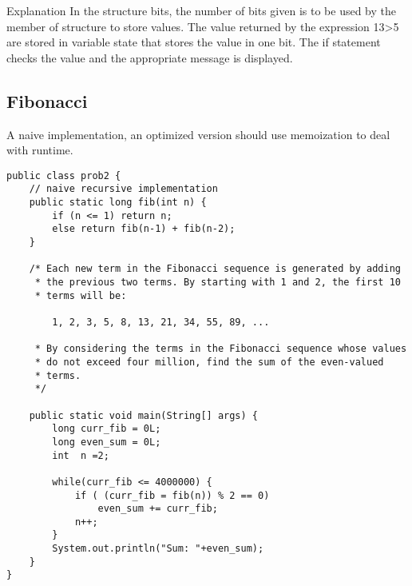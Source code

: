 \documentclass[letterpaper]{article}
\begin{document}
Explanation In the structure bits, the number of bits given is to be used by the member of structure to store values. The value returned by the expression 13>5 are stored in variable state that stores the value in one bit. The if statement checks the value and the appropriate message is displayed.

\subsection{Fibonacci}
A naive implementation, an optimized version should use memoization to deal with runtime.

\begin{lstlisting}
public class prob2 {
	// naive recursive implementation
	public static long fib(int n) {
        if (n <= 1) return n;
        else return fib(n-1) + fib(n-2);
    }
	
	/* Each new term in the Fibonacci sequence is generated by adding 
	 * the previous two terms. By starting with 1 and 2, the first 10 
	 * terms will be:

		1, 2, 3, 5, 8, 13, 21, 34, 55, 89, ...

	 * By considering the terms in the Fibonacci sequence whose values 
	 * do not exceed four million, find the sum of the even-valued 
	 * terms.
	 */

	public static void main(String[] args) {
		long curr_fib = 0L;
		long even_sum = 0L;
		int  n =2;
		
		while(curr_fib <= 4000000) {
			if ( (curr_fib = fib(n)) % 2 == 0)
				even_sum += curr_fib;
			n++;
		}
		System.out.println("Sum: "+even_sum);
	}
}
\end{lstlisting}
%  

%
\end{document}
